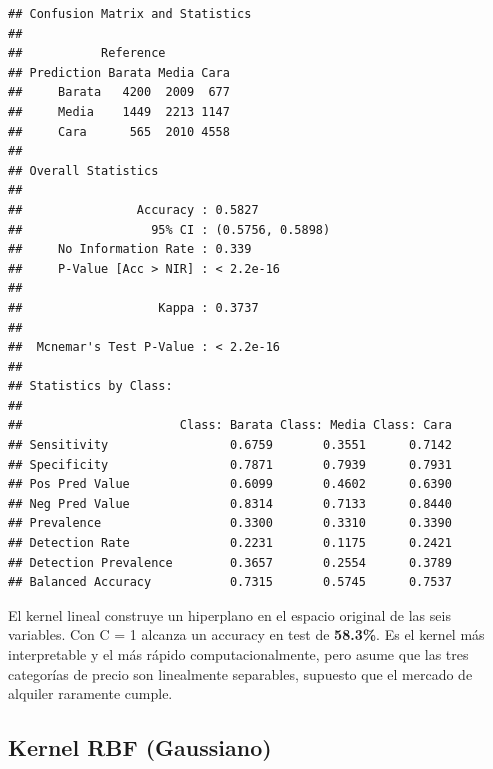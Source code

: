 \documentclass[
]{article}
\begin{document}
\begin{verbatim}
## Confusion Matrix and Statistics
## 
##           Reference
## Prediction Barata Media Cara
##     Barata   4200  2009  677
##     Media    1449  2213 1147
##     Cara      565  2010 4558
## 
## Overall Statistics
##                                           
##                Accuracy : 0.5827          
##                  95% CI : (0.5756, 0.5898)
##     No Information Rate : 0.339           
##     P-Value [Acc > NIR] : < 2.2e-16       
##                                           
##                   Kappa : 0.3737          
##                                           
##  Mcnemar's Test P-Value : < 2.2e-16       
## 
## Statistics by Class:
## 
##                      Class: Barata Class: Media Class: Cara
## Sensitivity                 0.6759       0.3551      0.7142
## Specificity                 0.7871       0.7939      0.7931
## Pos Pred Value              0.6099       0.4602      0.6390
## Neg Pred Value              0.8314       0.7133      0.8440
## Prevalence                  0.3300       0.3310      0.3390
## Detection Rate              0.2231       0.1175      0.2421
## Detection Prevalence        0.3657       0.2554      0.3789
## Balanced Accuracy           0.7315       0.5745      0.7537
\end{verbatim}

El kernel lineal construye un hiperplano en el espacio original de las
seis variables. Con C = 1 alcanza un accuracy en test de
\textbf{58.3\%}. Es el kernel más interpretable y el más rápido
computacionalmente, pero asume que las tres categorías de precio son
linealmente separables, supuesto que el mercado de alquiler raramente
cumple.

\subsection{Kernel RBF (Gaussiano)}\label{kernel-rbf-gaussiano}
\end{document}
